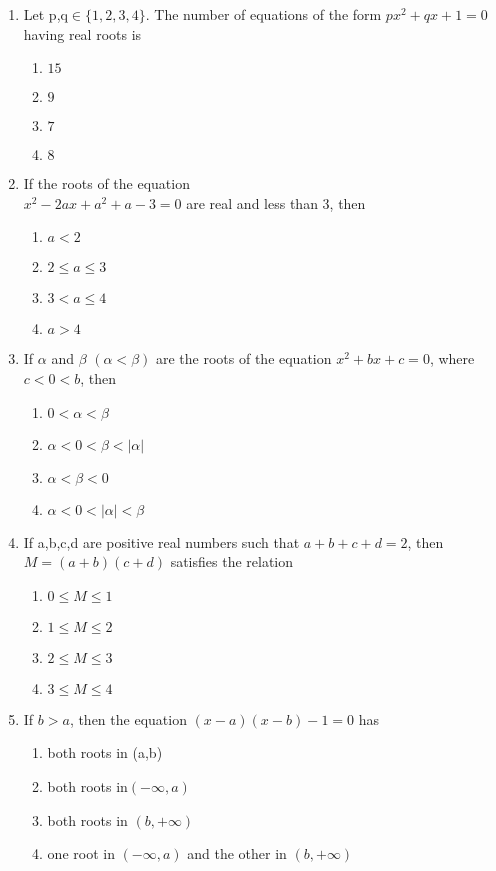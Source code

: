 \documentclass[journal,12pt,twocolumn]{IEEEtran}
\begin{document}
\begin{enumerate}[label=\arabic*]
\item Let p,q$\in\{1,2,3,4\} $. The number of equations of the form $px^{2}+qx+1=0$ having real roots is
\begin{enumerate}
\item $15$
\item $9$ 
\item $7$
\item $8$ 
\end{enumerate}

\item If the roots of the equation\\ $x^{2}-2ax+a^{2}+a-3=0$ are real and less than 3, then
\begin{enumerate}
\item $a<2$
\item $2\leq{a}\leq{3}$ 
\item $3<a\leq{4}$
\item $a>4$ 
\end{enumerate}

\item If $\alpha$ and $\beta$ $(\alpha<\beta)$ are the roots of the equation $x^{2}+bx+c=0$, where $c<0<b$, then
\begin{enumerate}
\item $0<\alpha<\beta$
\item $\alpha<0<\beta<|\alpha|$ 
\item $\alpha<\beta<0$
\item $\alpha<0<|\alpha|<\beta$
\end{enumerate}

\item If a,b,c,d are positive real numbers such that $a+b+c+d=2$, then $M=(a+b)(c+d)$ satisfies the relation 
\begin{enumerate}
\item $0\leq{M}\leq1$
\item $1\leq{M}\leq2$ 
\item $2\leq{M}\leq3$
\item $3\leq{M}\leq4$
\end{enumerate}

\item If $b>a$, then the equation $(x-a)(x-b)-1=0$ has 
\begin{enumerate}
\item both roots in (a,b)
\item both roots in$(-\infty,a)$ 
\item both roots in $(b,+\infty)$
\item one root in $(-\infty,a)$ and the other in $(b,+\infty)$
\end{enumerate}


\end{enumerate}
\end{document}
